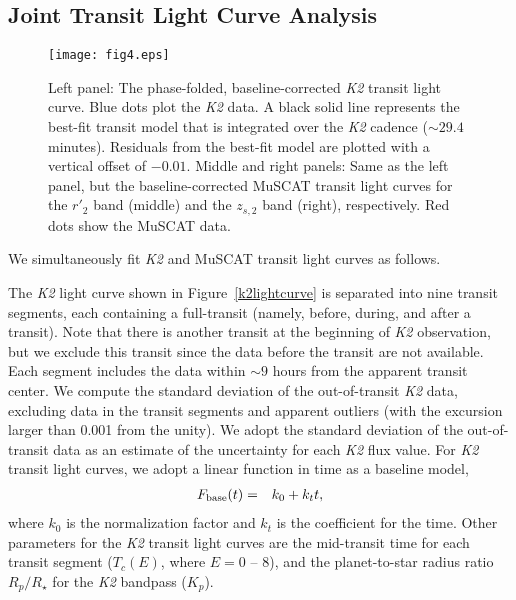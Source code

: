 \documentclass[]{pasj01}
\begin{document}
\subsection{Joint Transit Light Curve Analysis}

	\begin{figure*}[tp]
			\texttt{[image: fig4.eps]} 
			\caption{Left panel: The phase-folded, baseline-corrected {\it K2} transit light curve.
			Blue dots plot the {\it K2} data. A black solid line represents
			the best-fit transit model that is integrated over the {\it K2} cadence
			($\sim 29.4$ minutes). Residuals from the best-fit model
			are plotted with a vertical offset of $-0.01$.
			Middle and right panels: Same as the left panel, but the baseline-corrected
			MuSCAT transit light curves for the $r'_2$ band (middle) and
			the $z_{s,2}$ band (right), respectively. Red dots show the MuSCAT data.
			\label{transitlc}}
	\end{figure*}

We simultaneously fit {\it K2} and MuSCAT transit light curves as follows.

The {\it K2} light curve shown in Figure~\ref{k2lightcurve} is separated into nine transit segments,
each containing a full-transit (namely, before, during, and after a transit).
Note that there is another transit at the beginning of {\it K2} observation,
but we exclude this transit since the data before the transit are not available.
Each segment includes the data within $\sim 9$ hours from
the apparent transit center.
We compute the standard deviation of the out-of-transit {\it K2} data,
excluding data in the transit segments and apparent outliers
(with the excursion larger than 0.001 from the unity).
We adopt the standard deviation of the out-of-transit data
as an estimate of the uncertainty for each {\it K2} flux value.
For {\it K2} transit light curves, we adopt a linear function in time as a baseline model,
\begin{eqnarray*}
F_{\rm base} (t) &=& k_0 + k_t t,
\end{eqnarray*}
where $k_0$ is the normalization factor and $k_t$ is the coefficient for the time.
Other parameters for the {\it K2} transit light curves are the mid-transit time
for each transit segment ($T_c (E)$, where $E=0$ -- 8),
and the planet-to-star radius ratio $R_p/R_\star$ for the {\it K2} bandpass ($K_p$).
\end{document}
